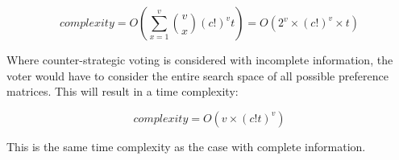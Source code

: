 \begin{equation}\label{eqn:coal2}
    complexity = O(\sum^v_{x=1}{\binom{v}{x}(c!)^v t}) = O(2^v \times (c!)^v \times t)
\end{equation}

Where counter-strategic voting is considered with incomplete information, the voter would have to consider the entire search space of all possible preference matrices. This will result in a time complexity:

\begin{equation}\label{eqn:coal3}
    complexity = O(v \times (c!t)^v)
\end{equation}

This is the same time complexity as the case with complete information.